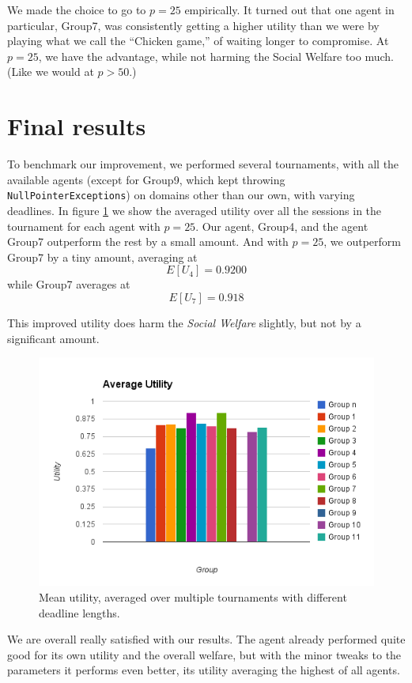 \documentclass[a4,11pt]{scrartcl}
\begin{document}
We made the choice to go to $p=25$ empirically. It turned out that one agent in particular, Group7, was consistently getting a higher utility than we were by playing what we call the ``Chicken game,'' of waiting longer to compromise. At $p=25$, we have the advantage, while not harming the Social Welfare too much. (Like we would at $p>50$.)


\section{Final results}

To benchmark our improvement, we performed several tournaments, with all the available agents (except for Group9, which kept throwing \verb|NullPointerExceptions|) on domains other than our own, with varying deadlines. In figure \ref{fig:utility} we show the averaged utility over all the sessions in the tournament for each agent with $p=25$. Our agent, Group4, and the agent Group7 outperform the rest by a small amount. And with $p=25$, we outperform Group7 by a tiny amount, averaging at $$E[U_{4}]=0.9200$$ while Group7 averages at $$E[U_{7}]=0.918$$

This improved utility does harm the \emph{Social Welfare} slightly, but not by a significant amount.

\begin{figure}[ht]
    \centering
    \includegraphics[width=\textwidth]{image.png}
    \caption{Mean utility, averaged over multiple tournaments with different deadline lengths.}
    \label{fig:utility}
\end{figure}


We are overall really satisfied with our results. The agent already performed quite good for its own utility and the overall welfare, but with the minor tweaks to the parameters it performs even better, its utility averaging the highest of all agents.
\label{sec:finalresults}
\end{document}

